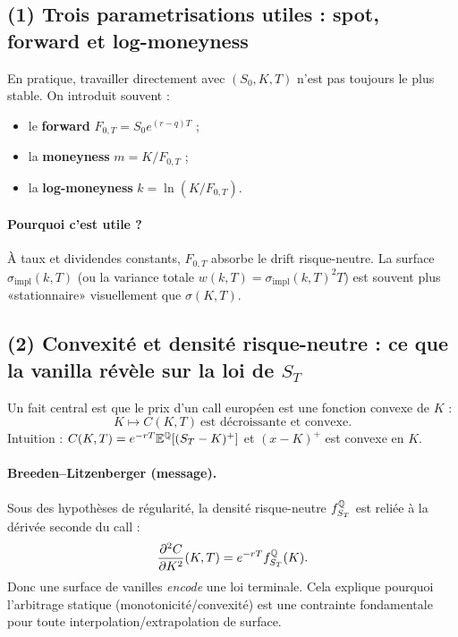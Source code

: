 
\subsection*{(1) Trois parametrisations utiles : spot, forward et log-moneyness}
En pratique, travailler directement avec $(S_0,K,T)$ n'est pas toujours le plus stable.
On introduit souvent :
\begin{itemize}[leftmargin=*]
\item le \textbf{forward} $F_{0,T}=S_0e^{(r-q)T}$ ;
\item la \textbf{moneyness} $m=K/F_{0,T}$ ;
\item la \textbf{log-moneyness} $k=\ln(K/F_{0,T})$.
\end{itemize}
\paragraph{Pourquoi c'est utile ?}
À taux et dividendes constants, $F_{0,T}$ absorbe le drift risque-neutre.
La surface $\sigma_{\mathrm{impl}}(k,T)$ (ou la variance totale $w(k,T)=\sigma_{\mathrm{impl}}(k,T)^2T$) est souvent plus «stationnaire» visuellement que $\sigma(K,T)$.

\subsection*{(2) Convexité et densité risque-neutre : ce que la vanilla révèle sur la loi de $S_T$}
Un fait central est que le prix d'un call européen est une fonction convexe de $K$ :
\[
K\mapsto C(K,T) \ \text{est décroissante et convexe}.
\]
Intuition : $C(K,T)=e^{-rT}\mathbb{E}^{\mathbb{Q}}[(S_T-K)^+]$ et $(x-K)^+$ est convexe en $K$.
\paragraph{Breeden--Litzenberger (message).}
Sous des hypothèses de régularité, la densité risque-neutre $f_{S_T}^{\mathbb{Q}}$ est reliée à la dérivée seconde du call :
\[
\frac{\partial^2 C}{\partial K^2}(K,T)=e^{-rT}f_{S_T}^{\mathbb{Q}}(K).
\]
Donc une surface de vanilles \emph{encode} une loi terminale.
Cela explique pourquoi l'arbitrage statique (monotonicité/convexité) est une contrainte fondamentale pour toute interpolation/extrapolation de surface.

